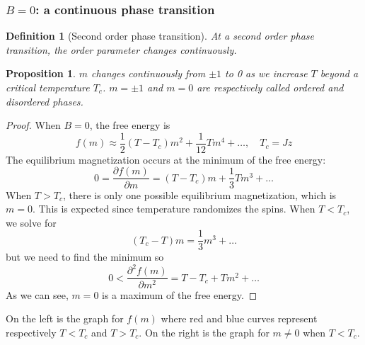 \documentclass[a4paper]{article}
\theoremstyle{new}
\newtheorem{defi}{Definition}[section]
\newtheorem{prop}{Proposition}[section]
\begin{document}
\subsubsection*{$B=0$: a continuous phase transition}
\begin{defi}[Second order phase transition]
At a second order phase transition, the order parameter changes continuously.
\end{defi}
\begin{prop}
$m$ changes continuously from $\pm1$ to 0 as we increase $T$ beyond a critical temperature $T_c$. $m=\pm1$ and $m=0$ are respectively called ordered and disordered phases.
\end{prop}
\begin{proof}
When $B=0$, the free energy is 
$$f(m)\approx\frac{1}{2}(T-T_c)m^2+\frac{1}{12}Tm^4+\dots,\quad T_c=Jz$$
The equilibrium magnetization occurs at the minimum of the free energy:
$$0=\frac{\partial f(m)}{\partial m}=(T-T_c)m+\frac{1}{3}Tm^3+\dots$$
When $T>T_c$, there is only one possible equilibrium magnetization, which is $m=0$. This is expected since temperature randomizes the spins. When $T<T_c$, we solve for
$$(T_c-T)m=\frac{1}{3}m^3+\dots$$
but we need to find the minimum so
$$0<\frac{\partial^2f(m)}{\partial m^2}=T-T_c+Tm^2+\dots$$
As we can see, $m=0$ is a maximum of the free energy.
\end{proof}
On the left is the graph for $f(m)$ where red and blue curves represent respectively $T<T_c$ and $T>T_c$. On the right is the graph for $m\neq 0$ when $T<T_c$. 
\begin{center}
\end{center}
\end{document}
